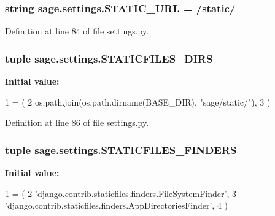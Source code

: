\subsubsection[{S\+T\+A\+T\+I\+C\+\_\+\+U\+R\+L}]{\setlength{\rightskip}{0pt plus 5cm}string sage.\+settings.\+S\+T\+A\+T\+I\+C\+\_\+\+U\+R\+L = \textquotesingle{}/static/\textquotesingle{}}\label{namespacesage_1_1settings_a0b4647cdde23eaed09c255182a9f576c}


Definition at line 84 of file settings.\+py.

\hypertarget{namespacesage_1_1settings_ac4ae870dea0d58410747ddcbdff2b3d7}{}
\subsubsection[{S\+T\+A\+T\+I\+C\+F\+I\+L\+E\+S\+\_\+\+D\+I\+R\+S}]{\setlength{\rightskip}{0pt plus 5cm}tuple sage.\+settings.\+S\+T\+A\+T\+I\+C\+F\+I\+L\+E\+S\+\_\+\+D\+I\+R\+S}\label{namespacesage_1_1settings_ac4ae870dea0d58410747ddcbdff2b3d7}
{\bfseries Initial value\+:}
\begin{DoxyCode}
1 = (
2         os.path.join(os.path.dirname(BASE\_DIR), \textcolor{stringliteral}{"sage/static/"}),
3 )
\end{DoxyCode}


Definition at line 86 of file settings.\+py.

\hypertarget{namespacesage_1_1settings_af629022b1da961fa9828f450bc80bd22}{}
\subsubsection[{S\+T\+A\+T\+I\+C\+F\+I\+L\+E\+S\+\_\+\+F\+I\+N\+D\+E\+R\+S}]{\setlength{\rightskip}{0pt plus 5cm}tuple sage.\+settings.\+S\+T\+A\+T\+I\+C\+F\+I\+L\+E\+S\+\_\+\+F\+I\+N\+D\+E\+R\+S}\label{namespacesage_1_1settings_af629022b1da961fa9828f450bc80bd22}
{\bfseries Initial value\+:}
\begin{DoxyCode}
1 = (
2     \textcolor{stringliteral}{'django.contrib.staticfiles.finders.FileSystemFinder'},
3     \textcolor{stringliteral}{'django.contrib.staticfiles.finders.AppDirectoriesFinder'},
4 )
\end{DoxyCode}


